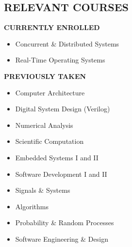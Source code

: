 \documentclass[margin]{res}
\begin{document}
\begin{resume}
  \section{RELEVANT COURSES}
  \vspace{-.125em}
  {\footnotesize\textbf{CURRENTLY ENROLLED}}
  \vspace{-.75em}
  \begin{multicols}{2}
    \begin{itemize}
    \item Concurrent \& Distributed Systems
    \item Real-Time Operating Systems
    \end{itemize}
  \end{multicols}
  \vspace{-1.5em}
  {\footnotesize\textbf{PREVIOUSLY TAKEN}}
  \vspace{-.75em}
  \begin{multicols}{2}
    \begin{itemize}
    \item Computer Architecture
    \item Digital System Design (Verilog)
    \item Numerical Analysis
    \item Scientific Computation
    \item Embedded Systems I and II
    \item Software Development I and II
    \item Signals \& Systems
    \item Algorithms
    \item Probability \& Random Processes
    \item Software Engineering \& Design
    \end{itemize}
  \end{multicols}


\end{resume}
\end{document}
